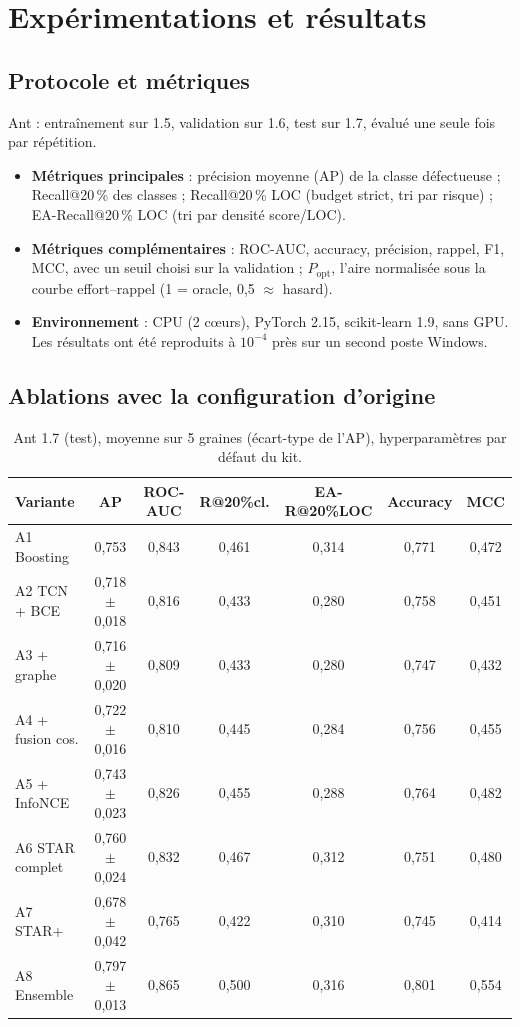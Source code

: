 \documentclass[11pt,a4paper,openany]{report}
\begin{document}
\chapter{Expérimentations et résultats}

\section{Protocole et métriques}
Ant : entraînement sur 1.5, validation sur 1.6, test sur 1.7, évalué une seule fois par répétition.
\begin{itemize}
  \item \textbf{Métriques principales} : précision moyenne (AP) de la classe défectueuse ; Recall@20\,\% des classes ;
        Recall@20\,\% LOC (budget strict, tri par risque) ; EA-Recall@20\,\% LOC (tri par densité score/LOC).
  \item \textbf{Métriques complémentaires} : ROC-AUC, accuracy, précision, rappel, F1, MCC, avec un seuil choisi sur
        la validation ; $P_{\mathrm{opt}}$, l'aire normalisée sous la courbe effort--rappel (1 = oracle, 0,5 $\approx$
        hasard).
  \item \textbf{Environnement} : CPU (2 cœurs), PyTorch 2.15, scikit-learn 1.9, sans GPU. Les résultats ont été
        reproduits à $10^{-4}$ près sur un second poste Windows.
\end{itemize}

\section{Ablations avec la configuration d'origine}
\begin{table}[htbp]
\centering\small
\caption{Ant 1.7 (test), moyenne sur 5 graines (écart-type de l'AP), hyperparamètres par défaut du kit.}
\label{tab:abl}
\begin{tabular}{lcccccc}
\toprule
\textbf{Variante} & \textbf{AP} & \textbf{ROC-AUC} & \textbf{R@20\%cl.} & \textbf{EA-R@20\%LOC} & \textbf{Accuracy} & \textbf{MCC} \\
\midrule
A1 Boosting        & 0,753            & 0,843 & 0,461 & 0,314 & 0,771 & 0,472 \\
A2 TCN + BCE       & 0,718 $\pm$ 0,018 & 0,816 & 0,433 & 0,280 & 0,758 & 0,451 \\
A3 + graphe        & 0,716 $\pm$ 0,020 & 0,809 & 0,433 & 0,280 & 0,747 & 0,432 \\
A4 + fusion cos.   & 0,722 $\pm$ 0,016 & 0,810 & 0,445 & 0,284 & 0,756 & 0,455 \\
A5 + InfoNCE       & 0,743 $\pm$ 0,023 & 0,826 & 0,455 & 0,288 & 0,764 & 0,482 \\
A6 STAR complet    & 0,760 $\pm$ 0,024 & 0,832 & 0,467 & 0,312 & 0,751 & 0,480 \\
A7 STAR+           & 0,678 $\pm$ 0,042 & 0,765 & 0,422 & 0,310 & 0,745 & 0,414 \\
A8 Ensemble        & 0,797 $\pm$ 0,013 & 0,865 & 0,500 & 0,316 & 0,801 & 0,554 \\
\bottomrule
\end{tabular}
\end{table}
\end{document}
